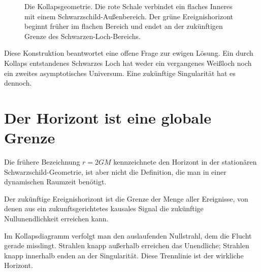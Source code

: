 \begin{figure}[htbp]
\centering
{}
\caption{Die Kollapsgeometrie. Die rote Schale verbindet ein flaches Inneres mit einem Schwarzschild-Außenbereich. Der grüne Ereignishorizont beginnt früher im flachen Bereich und endet an der zukünftigen Grenze des Schwarzen-Loch-Bereichs.}
\label{fig:l05-collapse}
\end{figure}

Diese Konstruktion beantwortet eine offene Frage zur ewigen Lösung. Ein durch Kollaps entstandenes Schwarzes Loch hat weder ein vergangenes Weißloch noch ein zweites asymptotisches Universum. Eine zukünftige Singularität hat es dennoch.

\section{Der Horizont ist eine globale Grenze}

Die frühere Bezeichnung \(r=2GM\) kennzeichnete den Horizont in der stationären Schwarzschild-Geometrie, ist aber nicht die Definition, die man in einer dynamischen Raumzeit benötigt.

\begin{definition}Der zukünftige Ereignishorizont ist die Grenze der Menge aller Ereignisse, von denen aus ein zukunftsgerichtetes kausales Signal die zukünftige Nullunendlichkeit erreichen kann.
\end{definition}

Im Kollapsdiagramm verfolgt man den auslaufenden Nullstrahl, dem die Flucht gerade misslingt. Strahlen knapp außerhalb erreichen das Unendliche; Strahlen knapp innerhalb enden an der Singularität. Diese Trennlinie ist der wirkliche Horizont.

